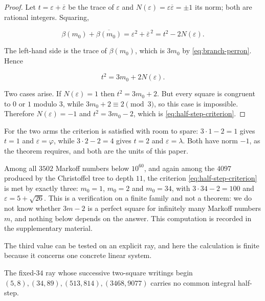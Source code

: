 \begin{proof}
Let $t=\varepsilon+\overline\varepsilon$ be the trace of $\varepsilon$ and
$N(\varepsilon)=\varepsilon\overline\varepsilon=\pm1$ its norm; both are
rational integers. Squaring,

\begin{equation}
 \beta(m_0)+\overline{\beta(m_0)}
 =\varepsilon^2+\overline\varepsilon^{\,2}
 =t^2-2N(\varepsilon).
\end{equation}

The left-hand side is the trace of $\beta(m_0)$, which is $3m_0$ by
\cref{eq:branch-perron}. Hence

\begin{equation}
 t^2=3m_0+2N(\varepsilon).
\end{equation}

Two cases arise. If $N(\varepsilon)=1$ then $t^2=3m_0+2$. But every square is
congruent to $0$ or $1$ modulo $3$, while $3m_0+2\equiv2\pmod3$, so this case
is impossible. Therefore $N(\varepsilon)=-1$ and $t^2=3m_0-2$, which is
\cref{eq:half-step-criterion}.
\end{proof}

For the two arms the criterion is satisfied with room to spare:
$3\cdot1-2=1$ gives $t=1$ and $\varepsilon=\varphi$, while
$3\cdot2-2=4$ gives $t=2$ and $\varepsilon=\lambda$. Both have norm $-1$, as
the theorem requires, and both are the units of this paper.

\begin{remark}
\label{rem:half-step-scan}
Among all $3502$ Markoff numbers below $10^{60}$, and again among the
$4097$ produced by the Christoffel tree to depth $11$, the criterion
\cref{eq:half-step-criterion} is met by exactly three: $m_0=1$, $m_0=2$ and
$m_0=34$, with $3\cdot34-2=100$ and $\varepsilon=5+\sqrt{26}$. This is a
verification on a finite family and not a theorem: we do not know whether
$3m-2$ is a perfect square for infinitely many Markoff numbers $m$, and
nothing below depends on the answer. This computation is recorded in the
supplementary material.
\end{remark}

The third value can be tested on an explicit ray, and here the calculation is
finite because it concerns one concrete linear system.

\begin{proposition}
\label{prop:no-half-step-34}
The fixed-$34$ ray whose successive two-square writings begin
$(5,8),(34,89),(513,814),(3468,9077)$ carries no common integral half-step.
\end{proposition}

